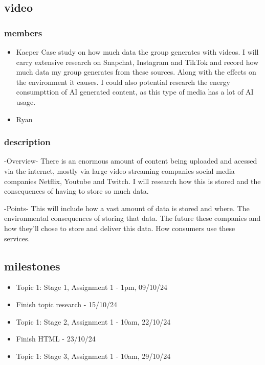 \documentclass{article}
\begin{document}
\subsection{video}
\subsubsection{members}
\begin{itemize}
    \item Kacper
    Case study on how much data the group generates with videos.
    I will carry extensive research on Snapchat, Instagram and TikTok and record how much data my group generates from these sources.
    Along with the effects on the environment it causes.
    I could also potential research the energy consumpttion of AI generated content, as this type of media has a lot of AI usage.
    
    
    \item Ryan
\end{itemize}
\subsubsection{description}
    -Overview-
    There is an enormous amount of content being uploaded and acessed via the internet, mostly via large video 
    streaming companies social media companies Netflix, Youtube and Twitch. I will research
    how this is stored and the consequences of having to store so much data.

    -Points-
    This will include how a vast amount of data is stored and where. 
    The environmental consequences of storing that data.
    The future these companies and how they'll chose to store and deliver this data.
    How consumers use these services.

\subsection{milestones}
\begin{itemize}
    \item Topic 1: Stage 1, Assignment 1 - 1pm, 09/10/24
    \item Finish topic research - 15/10/24
    \item Topic 1: Stage 2, Assignment 1 - 10am, 22/10/24
    \item Finish HTML - 23/10/24
    \item Topic 1: Stage 3, Assignment 1 - 10am, 29/10/24
\end{itemize}
\end{document}
